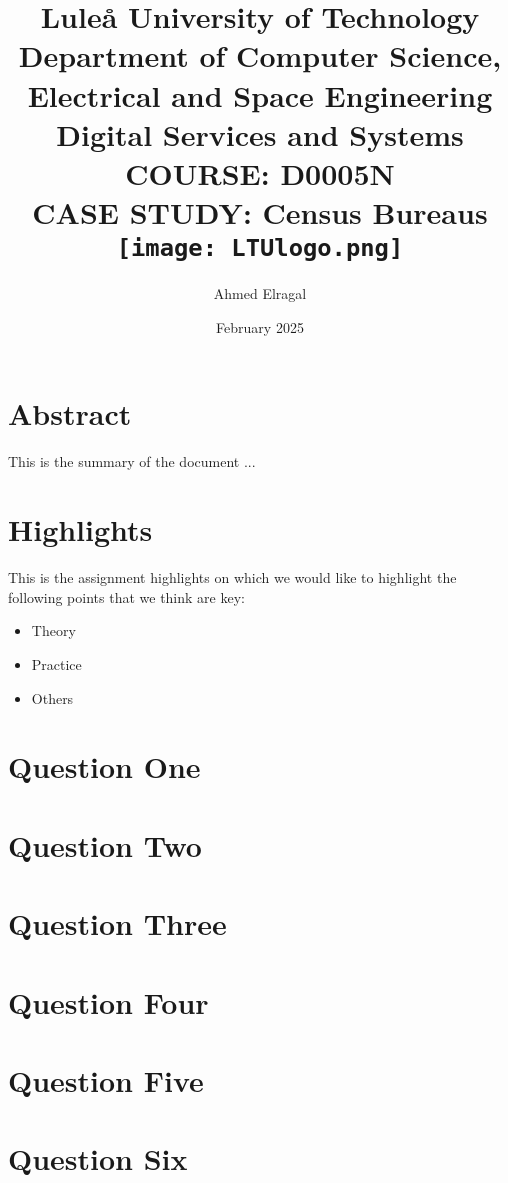 \documentclass[12p,a4paper]{report}
\title{
    {\large Luleå University of Technology}\\
    {\large Department of Computer Science, Electrical and Space Engineering}\\
    {\large Digital Services and Systems}\\
    {\large COURSE: D0005N}\\
    {CASE STUDY: Census Bureaus}\\
    {\centering\texttt{[image: LTUlogo.png]}}\\
}
\author{Ahmed Elragal}
\date{February  2025}
\begin{document}
\maketitle

\chapter*{Abstract}
This is the summary of the document ...


\chapter*{Highlights}
This is the assignment highlights on which we would like to highlight the following points that we think are key:
\begin{itemize}
    \item Theory 
    \item Practice
    \item Others
\end{itemize}

\tableofcontents

\chapter{Question One}


\chapter{Question Two}


\chapter{Question Three}


\chapter{Question Four}


\chapter{Question Five}


\chapter{Question Six}

\end{document}
